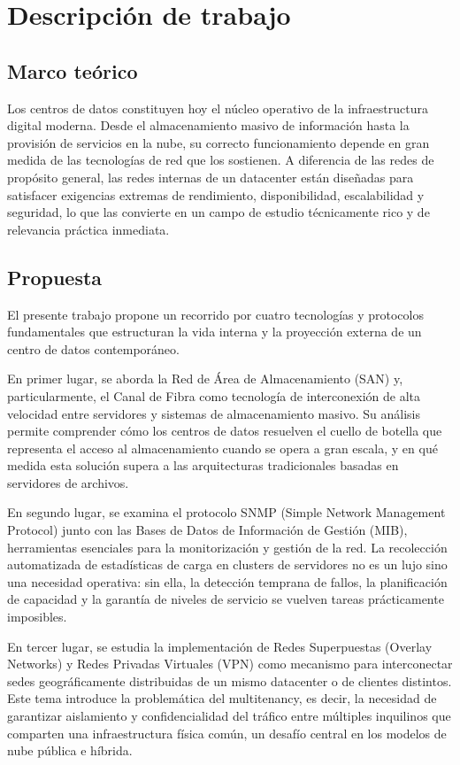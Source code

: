 \documentclass[12pts, a4paper]{book}
\begin{document}
	
	\section{Descripción de trabajo}
	
	\subsection{Marco teórico}
	
	Los centros de datos constituyen hoy el núcleo operativo de la infraestructura digital moderna. Desde el almacenamiento masivo de información hasta la provisión de servicios en la nube, su correcto funcionamiento depende en gran medida de las tecnologías de red que los sostienen. A diferencia de las redes de propósito general, las redes internas de un datacenter están diseñadas para satisfacer exigencias extremas de rendimiento, disponibilidad, escalabilidad y seguridad, lo que las convierte en un campo de estudio técnicamente rico y de relevancia práctica inmediata.
	
	\subsection{Propuesta}
	
	El presente trabajo propone un recorrido por cuatro tecnologías y protocolos fundamentales que estructuran la vida interna y la proyección externa de un centro de datos contemporáneo. 
	
	En primer lugar, se aborda la Red de Área de Almacenamiento (SAN) y, particularmente, el Canal de Fibra como tecnología de interconexión de alta velocidad entre servidores y sistemas de almacenamiento masivo. Su análisis permite comprender cómo los centros de datos resuelven el cuello de botella que representa el acceso al almacenamiento cuando se opera a gran escala, y en qué medida esta solución supera a las arquitecturas tradicionales basadas en servidores de archivos.
	
	En segundo lugar, se examina el protocolo SNMP (Simple Network Management Protocol) junto con las Bases de Datos de Información de Gestión (MIB), herramientas esenciales para la monitorización y gestión de la red. La recolección automatizada de estadísticas de carga en clusters de servidores no es un lujo sino una necesidad operativa: sin ella, la detección temprana de fallos, la planificación de capacidad y la garantía de niveles de servicio se vuelven tareas prácticamente imposibles.
	
	En tercer lugar, se estudia la implementación de Redes Superpuestas (Overlay Networks) y Redes Privadas Virtuales (VPN) como mecanismo para interconectar sedes geográficamente distribuidas de un mismo datacenter o de clientes distintos. Este tema introduce la problemática del multitenancy, es decir, la necesidad de garantizar aislamiento y confidencialidad del tráfico entre múltiples inquilinos que comparten una infraestructura física común, un desafío central en los modelos de nube pública e híbrida.
	
\end{document}
